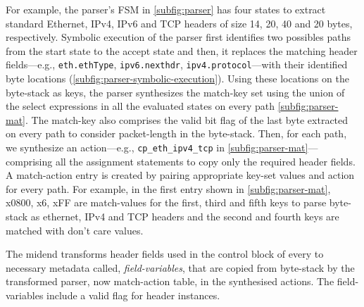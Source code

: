 \documentclass[letterpaper,twocolumn,10pt]{article}
\begin{document}
For example, the parser's FSM in \cref{subfig:parser} has four states
to extract standard Ethernet, IPv4, IPv6 and TCP headers of size 14,
20, 40 and 20 bytes, respectively. Symbolic execution of the parser
first identifies two possibles paths from the start state to the
accept state and then, it replaces the matching header fields---e.g.,
\texttt{eth.ethType}, \texttt{ipv6.nexthdr},
\texttt{ipv4.protocol}---with their identified byte locations
(\cref{subfig:parser-symbolic-execution}).
Using these locations on the byte-stack as keys, the parser
synthesizes the match-key set using the union of the select
expressions in all the evaluated states on every path
\cref{subfig:parser-mat}. The match-key also comprises the valid bit
flag of the last byte extracted on every path to consider
packet-length in the byte-stack. Then, for each path, we synthesize an
action---e.g., \texttt{cp\_eth\_ipv4\_tcp} in
\cref{subfig:parser-mat}---comprising all the assignment statements to
copy only the required header fields. A match-action entry is created
by pairing appropriate key-set values and action for every path.
For example, in the first entry shown in \cref{subfig:parser-mat},
x0800, x6, xFF are match-values for the first, third and fifth keys to
parse byte-stack as ethernet, IPv4 and TCP headers and the second and
fourth keys are matched with don't care values.

The midend transforms header fields used in the control block of every
\uprogram to necessary metadata called, \emph{field-variables}, that
are copied from  byte-stack by the transformed parser, now
match-action table, in the synthesised actions. The field-variables
include a valid flag for header instances.
\end{document}
